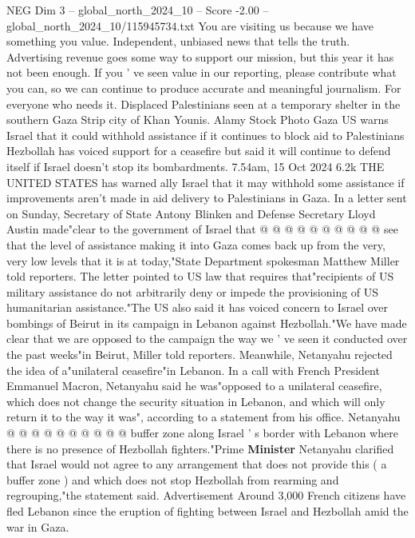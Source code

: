 \begin{textsample}{NEG Dim 3 – global\_north\_2024\_10 – Score -2.00 – global\_north\_2024\_10/115945734.txt}  \label{ex:f3_neg_329}
You are visiting us because we have something you value.
Independent, unbiased news that tells the truth.
Advertising revenue goes some way to support our mission, but this year it has not been enough.
If you ' ve seen value in our reporting, please contribute what you can, so we can continue to produce accurate and meaningful journalism.
For everyone who needs it.
Displaced Palestinians seen at a temporary shelter in the southern Gaza Strip city of Khan Younis.
Alamy Stock Photo Gaza US warns Israel that it could withhold assistance if it continues to block aid to Palestinians Hezbollah has voiced support for a ceasefire but said it will continue to defend itself if Israel doesn't stop its bombardments. 7.54am, 15 Oct 2024 6.2k THE UNITED STATES has warned ally Israel that it may withhold some assistance if improvements aren't made in aid delivery to Palestinians in Gaza.
In a letter sent on Sunday, Secretary of State Antony Blinken and Defense Secretary Lloyd Austin made"clear to the government of Israel that @ @ @ @ @ @ @ @ @ @ see that the level of assistance making it into Gaza comes back up from the very, very low levels that it is at today,"State Department spokesman Matthew Miller told reporters.
The letter pointed to US law that requires that"recipients of US military assistance do not arbitrarily deny or impede the provisioning of US humanitarian assistance."The US also said it has voiced concern to Israel over bombings of Beirut in its campaign in Lebanon against Hezbollah."We have made clear that we are opposed to the campaign the way we ' ve seen it conducted over the past weeks"in Beirut, Miller told reporters.
Meanwhile, Netanyahu rejected the idea of a"unilateral ceasefire"in Lebanon.
In a call with French President Emmanuel Macron, Netanyahu said he was"opposed to a unilateral ceasefire, which does not change the security situation in Lebanon, and which will only return it to the way it was", according to a statement from his office.
Netanyahu @ @ @ @ @ @ @ @ @ @ buffer zone along Israel ' s border with Lebanon where there is no presence of Hezbollah fighters."Prime \textbf{Minister} Netanyahu clarified that Israel would not agree to any arrangement that does not provide this ( a buffer zone ) and which does not stop Hezbollah from rearming and regrouping,"the statement said.
Advertisement Around 3,000 French citizens have fled Lebanon since the eruption of fighting between Israel and Hezbollah amid the war in Gaza.

\end{textsample}
